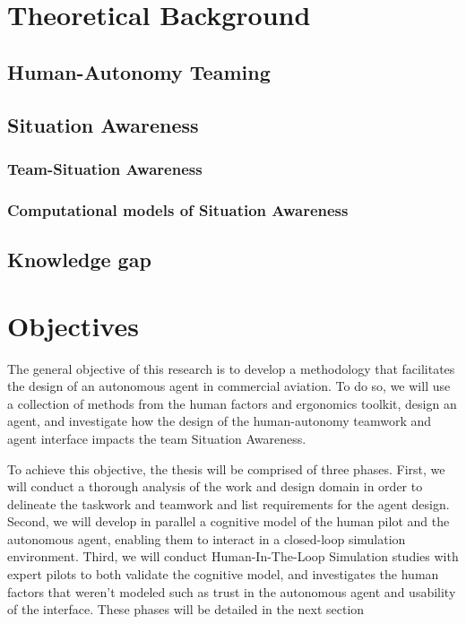 \documentclass[12pt,a4paper]{article} %
\begin{document}
	\section{Theoretical Background}
	\subsection{Human-Autonomy Teaming}
	\subsection{Situation Awareness}
	\subsubsection{Team-Situation Awareness}
	\subsubsection{Computational models of Situation Awareness}
	\subsection{Knowledge gap} %
	
	
	\section{Objectives} %
	The general objective of this research is to develop a methodology that facilitates the design of an autonomous agent in commercial aviation. To do so, we will use a collection of methods from the human factors and ergonomics toolkit, design an agent, and investigate how the design of the human-autonomy teamwork and agent interface impacts the team Situation Awareness.
	
	To achieve this objective, the thesis will be comprised of three phases. First, we will conduct a thorough analysis of the work and design domain in order to delineate the taskwork and teamwork and list requirements for the agent design. Second, we will develop in parallel a cognitive model of the human pilot and the autonomous agent, enabling them to interact in a closed-loop simulation environment. Third, we will conduct Human-In-The-Loop Simulation studies with expert pilots to both validate the cognitive model, and investigates the human factors that weren't modeled such as trust in the autonomous agent and usability of the interface. These phases will be detailed in the next section 
	
\end{document}
